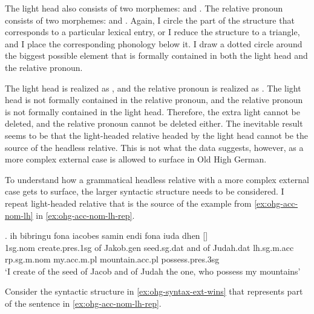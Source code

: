 The light head also consists of two morphemes:  and .
The relative pronoun consists of two morphemes:  and .
Again, I circle the part of the structure that corresponds to a particular lexical entry, or I reduce the structure to a triangle, and I place the corresponding phonology below it.
I draw a dotted circle around the biggest possible element that is formally contained in both the light head and the relative pronoun.

The light head is realized as , and the relative pronoun is realized as .
The light head is not formally contained in the relative pronoun, and the relative pronoun is not formally contained in the light head.
Therefore, the extra light cannot be deleted, and the relative pronoun cannot be deleted either.
The inevitable result seems to be that the light-headed relative headed by the light head cannot be the source of the headless relative.
This is not what the data suggests, however, as a more complex external case is allowed to surface in Old High German.

To understand how a grammatical headless relative with a more complex external case gets to surface, the larger syntactic structure needs to be considered. I repeat light-headed relative that is the source of the example from \ref{ex:ohg-acc-nom-lh} in \ref{ex:ohg-acc-nom-lh-rep}.

\exg. ih bibringu fona iacobes samin endi fona iuda dhen []   \\
1\ac{sg}.\ac{nom} {create}.\ac{pres}.1\ac{sg}\scsub{[acc]} of Jakob.\ac{gen} seed.\ac{sg}.\ac{dat} and of Judah.\ac{dat} \ac{lh}.\ac{sg}.\ac{m}.\ac{acc} \ac{rp}.\ac{sg}.\ac{m}.\ac{nom} my.\ac{acc}.\ac{m}.\ac{pl} mountain.\ac{acc}.\ac{pl} possess.\ac{pres}.3\ac{sg}\scsub{[nom]}\\
`I create of the seed of Jacob and of Judah the one, who possess my mountains' \label{ex:ohg-acc-nom-lh-rep}

Consider the syntactic structure in \ref{ex:ohg-syntax-ext-wins} that represents part of the sentence in \ref{ex:ohg-acc-nom-lh-rep}.

